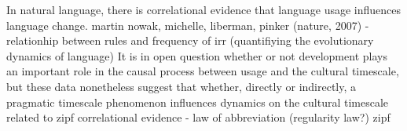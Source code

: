 \documentclass[man, noapacite, 12pt]{apa2}
\begin{document}
In natural language, there is correlational evidence that language usage influences language change.  martin nowak,  michelle, liberman, pinker (nature, 2007) -  relationhip between rules and frequency of irr (quantifiying the evolutionary dynamics of language)
It is in open question whether or not development plays an important role in the causal process between usage and the cultural timescale, but these data nonetheless suggest that whether, directly or indirectly, a pragmatic timescale phenomenon influences dynamics on the cultural timescale
related to zipf correlational evidence  - law of abbreviation (regularity law?)
zipf




\end{document}
